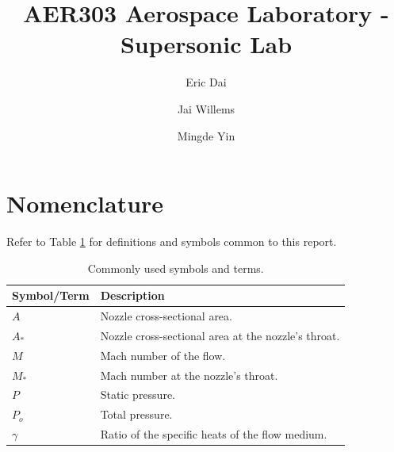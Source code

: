 \documentclass[runningheads]{llncs}
\begin{document}
\title{AER303 Aerospace Laboratory - Supersonic Lab}

\author{Eric Dai \and Jai Willems \and Mingde Yin}


\maketitle




\begin{abstract}


\end{abstract}




\newpage
\section{Nomenclature}

Refer to Table \ref{tab:nomenclature} for definitions and symbols common to this report.

\begin{table}[h]
    \centering
    \begin{tabular}{p{4.5cm}p{11cm}}
        \toprule
        Symbol/Term & Description \\
        \midrule
        $A$ & Nozzle cross-sectional area. \\
        $A_*$ & Nozzle cross-sectional area at the nozzle's throat. \\
        $M$ & Mach number of the flow. \\
        $M_*$ & Mach number at the nozzle's throat. \\
        $P$ & Static pressure. \\
        $P_o$ & Total pressure. \\
        $\gamma$ & Ratio of the specific heats of the flow medium. \\
        \bottomrule
    \end{tabular}
    \caption{Commonly used symbols and terms.}
    \label{tab:nomenclature}
\end{table}
\end{document}
